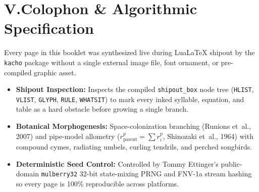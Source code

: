 \documentclass[11pt,a4paper,twoside]{article}
\begin{document}
\bigskip
\section*{V.\quad Colophon \& Algorithmic Specification}

Every page in this booklet was synthesized live during Lua\LaTeX{} shipout by the \texttt{kacho} package without a single external image file, font ornament, or pre-compiled graphic asset.
\begin{itemize}
  \item \textbf{Shipout Inspection:} Inspects the compiled \texttt{shipout\_box} node tree (\texttt{HLIST}, \texttt{VLIST}, \texttt{GLYPH}, \texttt{RULE}, \texttt{WHATSIT}) to mark every inked syllable, equation, and table as a hard obstacle before growing a single branch.
  \item \textbf{Botanical Morphogenesis:} Space-colonization branching (Runions et~al., 2007) and pipe-model allometry ($r_{\text{parent}}^{p} = \sum r_i^{p}$, Shinozaki et~al., 1964) with compound cymes, radiating umbels, curling tendrils, and perched songbirds.
  \item \textbf{Deterministic Seed Control:} Controlled by Tommy Ettinger's public-domain \texttt{mulberry32} 32-bit state-mixing PRNG and FNV-1a stream hashing so every page is 100\% reproducible across platforms.
\end{itemize}
\end{document}
